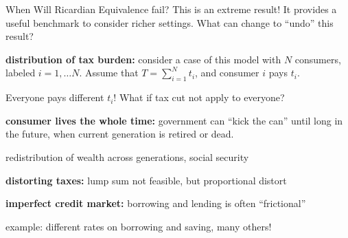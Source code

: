 \documentclass[11pt,aspectratio=169,usenames,dvipsnames]{beamer}
\let\tempone\itemize
\let\temptwo\enditemize
\renewenvironment{itemize}{\tempone\addtolength{\itemsep}{\fill}}{\temptwo}
\let\tempa\enumerate
\let\tempb\endenumerate
\renewenvironment{enumerate}{\tempa\addtolength{\itemsep}{\fill}}{\tempb}
\begin{document}
\begin{frame}{When Will Ricardian Equivalence fail?}
\label{slide:When_Will_Ricardian_Equivalence_fail_}
    This is an extreme result! It provides a useful \alert{benchmark} to consider richer settings. What can change to ``undo'' this result?
    \begin{enumerate}
        \item \textbf{distribution of tax burden:} consider a case of this model with $ N $ consumers, labeled $ i = 1, \ldots N$. Assume that $ T = \sum_{i=1}^{N} t_{i} $, and consumer $ i $ pays $ t_{i} $.
        \begin{itemize}
            \item Everyone pays different $ t_{i} $! What if tax cut not apply to everyone?
        \end{itemize}
        \item \textbf{consumer lives the whole time:} government can ``kick the can'' until long in the future, when current generation is retired or dead.
        \begin{itemize}
            \item redistribution of wealth across generations, social security
        \end{itemize}
        \item \textbf{distorting taxes:} lump sum not feasible, but proportional distort
        \item \textbf{imperfect credit market:} borrowing and lending is often ``\alert{frictional}''
        \begin{itemize}
            \item example: different rates on borrowing and saving, many others!
        \end{itemize}
    \end{enumerate}
\end{frame}
\end{document}

